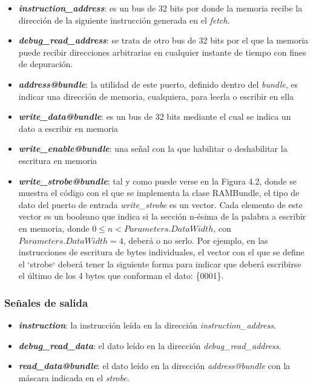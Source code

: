 \begin{itemize}
  \item \textbf{\textit{instruction\_address}}: es un bus de 32 bits por donde la memoria recibe la dirección de la siguiente instrucción generada en el \textit{fetch}.
  \vspace{-0.2cm}
  \item \textbf{\textit{debug\_read\_address}}: se trata de otro bus de 32 bits por el que la memoria puede recibir direcciones arbitrarias en cualquier instante de tiempo con fines de depuración.
  \vspace{-0.2cm}
  \item \textbf{\textit{address@bundle}}: la utilidad de este puerto, definido dentro del \textit{bundle}, es indicar una dirección de memoria, cualquiera, para leerla o escribir en ella
  \vspace{-0.2cm}
  \item \textbf{\textit{write\_data@bundle}}: es un bus de 32 bits mediante el cual se indica un dato a escribir en memoria
  \vspace{-0.2cm}
  \item \textbf{\textit{write\_enable@bundle}}: una señal con la que habilitar o deshabilitar la escritura en memoria
  \vspace{-0.2cm}
  \item \textbf{\textit{write\_strobe@bundle}}: tal y como puede verse en la Figura 4.2, donde se muestra el código con el que se implementa la clase RAMBundle, el tipo de dato del puerto de entrada \textit{write\_strobe} es un vector. Cada elemento de este vector es un booleano que indica si la sección n-ésima de la palabra a escribir en memoria, donde $0 \le n < Parameters.DataWidth$, con $Parameters.DataWidth = 4$, deberá o no serlo. Por ejemplo, en las instrucciones de escritura de bytes individuales, el vector con el que se define el `strobe` deberá tener la siguiente forma para indicar que deberá escribirse el último de los 4 bytes que conforman el dato: \{0001\}.
\end{itemize}

\subsubsection{Señales de salida}
\begin{itemize}
  \item \textbf{\textit{instruction}}: la instrucción leída en la dirección \textit{instruction\_address}.
  \vspace{-0.2cm}
  \item \textbf{\textit{debug\_read\_data}}: el dato leído en la dirección \textit{debug\_read\_address}.
  \vspace{-0.2cm}
  \item \textbf{\textit{read\_data@bundle}}: el dato leído en la dirección \textit{address@bundle} con la máscara indicada en el \textit{strobe}.
\end{itemize}

